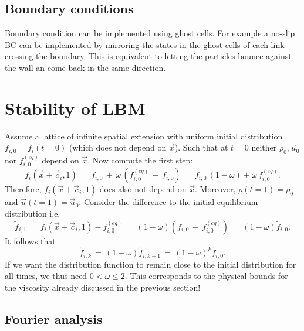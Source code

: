 \subsection{Boundary conditions}

Boundary condition can be implemented using ghost cells. For example a no-slip BC can be implemented by mirroring the states in the ghost cells of each link crossing the boundary. This is equivalent to letting the particles bounce against the wall an come back in the same direction.

\section{Stability of LBM}

Assume a lattice of infinite spatial extension with uniform initial distribution $f_{i,0}=f_i(t=0)$ (which does not depend on $\vec x$). Such that at $t=0$ neither $\rho_0, \vec u_0$ nor $f_{i,0}^{(eq)}$ depend on $\vec x$. Now compute the first step:
\begin{equation}
 f_i (\vec x + \vec c_i, 1)\,=\, f_{i,0} \, + \, \omega \, (f_{i,0}^{(eq)} \, -\, f_{i,0} )\,=\,  f_{i,0} \,(1-\omega)+\omega\,f_{i,0}^{(eq)}.\nonumber
\end{equation}
Therefore, $f_i (\vec x + \vec c_i, 1)$ does also not depend on $\vec x$. Moreover, $\rho(t=1)=\rho_0$ and $ \vec u(t=1)=\vec u_0$. Consider the difference to the initial equilibrium distribution i.e.
\begin{equation}
 \tilde f_{i,1}\,=\, f_i (\vec x + \vec c_i, 1) - f_{i,0}^{(eq)}\,=\,  (1-\omega) (f_{i,0} \, -\, f_{i,0}^{(eq)} )  \,=\, (1-\omega) \tilde f_{i,0} .\nonumber
\end{equation}
It follows that
\begin{equation}
 \tilde f_{i,k}\,=\,  (1-\omega) \tilde f_{i,k-1} \,=\,  (1-\omega)^k \tilde f_{i,0} .\nonumber
\end{equation}
If we want the distribution function to remain close to the initial distribution for all times, we thus need $0 < \omega \le 2$. This corresponds to the physical bounds for the viscosity already discussed in the previous section!

\subsection{Fourier analysis}

